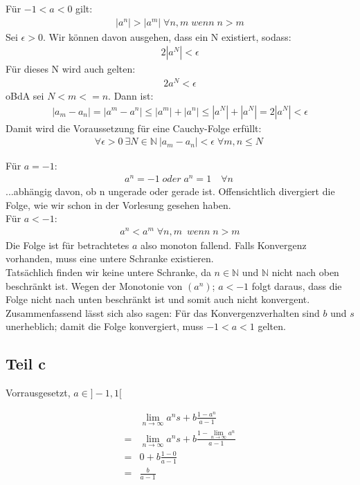 \documentclass[a4paper,german,12pt,smallheadings]{scrartcl}
\begin{document}
Für $-1<a<0$ gilt:
\begin{align*}
|a^n|>|a^m|\;\forall n,m \;wenn\; n>m
\end{align*}
Sei $\epsilon>0$. Wir können davon ausgehen, dass ein N existiert, sodass:
\begin{align*}
2|a^N|<\epsilon
\end{align*}
Für dieses N wird auch gelten:
\begin{align*}
2a^N<\epsilon
\end{align*}
oBdA sei $N<m<=n$. Dann ist:
\begin{align*}
|a_m-a_n|=|a^m-a^n|\leq|a^m|+|a^n|\leq|a^N|+|a^N|=2|a^N|<\epsilon
\end{align*}
Damit wird die Voraussetzung für eine Cauchy-Folge erfüllt:
\begin{align*}
\forall \epsilon>0\ \exists N \in \mathbb{N} \: |a_m-a_n|<\epsilon \; \forall m,n \leq N \
\end{align*}

Für $a=-1$:
\begin{align*}
a^n=-1 \;oder\; a^n=1 \quad \forall n\
\end{align*}
...abhängig davon, ob n ungerade oder gerade ist. Offensichtlich divergiert die Folge, wie wir schon in der Vorlesung gesehen haben.\\

Für $a<-1$:
\begin{align*}
a^n<a^m\;\forall n,m\ \;wenn\; n>m
\end{align*}
Die Folge ist für betrachtetes $a$ also monoton fallend. Falls Konvergenz vorhanden, muss eine untere Schranke existieren.\\
Tatsächlich finden wir keine untere Schranke, da $n \in \mathbb{N}$ und $\mathbb{N}$ nicht nach oben beschränkt ist. Wegen der Monotonie von $(a^n)$; $a<-1$ folgt daraus, dass die Folge nicht nach unten beschränkt ist und somit auch nicht konvergent.\\

Zusammenfassend lässt sich also sagen: Für das Konvergenzverhalten sind $b$ und
$s$ unerheblich; damit die Folge konvergiert, muss $-1 < a < 1$ gelten.

\subsection*{Teil c}

Vorrausgesetzt, $a \in ]-1,1[$

\begin{align*}
  &\lim_{n \to \infty} a^ns + b \frac{1-a^n}{a-1} \\
  = & \lim_{n \to \infty} a^ns + b \frac{1-\lim_{n \to \infty} a^n}{a-1} \\
  = & 0 + b \frac{1-0}{a-1} \\
  = & \frac{b}{a-1}
\end{align*}
\end{document}

